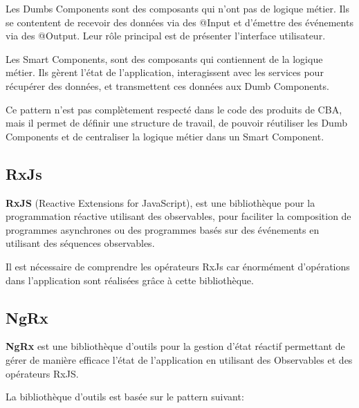 \documentclass{article}
\begin{document}
Les Dumbs Components sont des composants qui n'ont pas de logique métier. Ils se contentent de recevoir des données via des @Input et d'émettre des événements via des @Output. Leur rôle principal est de présenter l'interface utilisateur.

Les Smart Components, sont des composants qui contiennent de la logique métier. Ils gèrent l'état de l'application, interagissent avec les services pour récupérer des données, et transmettent ces données aux Dumb Components.

Ce pattern n'est pas complètement respecté dans le code des produits de CBA, mais il permet de définir une structure de travail, de pouvoir réutiliser les Dumb Components et de centraliser la logique métier dans un Smart Component.

\subsection{RxJs}
\textbf{RxJS} (Reactive Extensions for JavaScript), est une bibliothèque pour la programmation réactive utilisant des observables, pour faciliter la composition de programmes asynchrones ou des programmes basés sur des événements en utilisant des séquences observables.

Il est nécessaire de comprendre les opérateurs RxJs car énormément d'opérations dans l'application sont réalisées grâce à cette bibliothèque.

\subsection{NgRx\label{section:ngrx}}

\textbf{NgRx} est une bibliothèque d'outils pour la gestion d'état réactif permettant de gérer de manière efficace l'état de l'application en utilisant des Observables et des opérateurs RxJS.

La bibliothèque d'outils est basée sur le pattern suivant:

\end{document}
